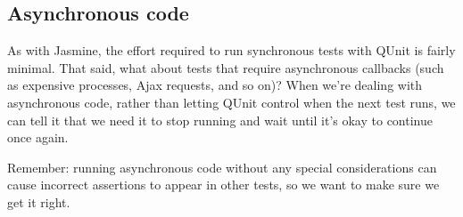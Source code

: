 \documentclass[9pt]{book}
\newenvironment{Shaded}{}{}
\newcommand{\KeywordTok}[1]{\textcolor[rgb]{0.00,0.44,0.13}{\textbf{{#1}}}}
\newcommand{\DecValTok}[1]{\textcolor[rgb]{0.25,0.63,0.44}{{#1}}}
\newcommand{\StringTok}[1]{\textcolor[rgb]{0.25,0.44,0.63}{{#1}}}
\newcommand{\OtherTok}[1]{\textcolor[rgb]{0.00,0.44,0.13}{{#1}}}
\newcommand{\FunctionTok}[1]{\textcolor[rgb]{0.02,0.16,0.49}{{#1}}}
\newcommand{\NormalTok}[1]{{#1}}
\begin{document}
\begin{Shaded}
\end{Shaded}

\subsection{Asynchronous code}\label{asynchronous-code}

As with Jasmine, the effort required to run synchronous tests with QUnit
is fairly minimal. That said, what about tests that require asynchronous
callbacks (such as expensive processes, Ajax requests, and so on)? When
we're dealing with asynchronous code, rather than letting QUnit control
when the next test runs, we can tell it that we need it to stop running
and wait until it's okay to continue once again.

Remember: running asynchronous code without any special considerations
can cause incorrect assertions to appear in other tests, so we want to
make sure we get it right.
\end{document}
